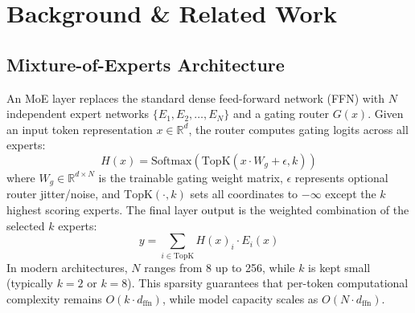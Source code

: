 \documentclass[10pt,journal,compsoc]{IEEEtran}
\begin{document}
\section{Background \& Related Work}
\label{sec:background}

\subsection{Mixture-of-Experts Architecture}
An MoE layer replaces the standard dense feed-forward network (FFN) with $N$ independent expert networks $\{E_1, E_2, \dots, E_N\}$ and a gating router $G(x)$. Given an input token representation $x \in \mathbb{R}^d$, the router computes gating logits across all experts:
\begin{equation}
    H(x) = \text{Softmax}(\text{TopK}(x \cdot W_g + \epsilon, k))
\end{equation}
where $W_g \in \mathbb{R}^{d \times N}$ is the trainable gating weight matrix, $\epsilon$ represents optional router jitter/noise, and $\text{TopK}(\cdot, k)$ sets all coordinates to $-\infty$ except the $k$ highest scoring experts. The final layer output is the weighted combination of the selected $k$ experts:
\begin{equation}
    y = \sum_{i \in \text{TopK}} H(x)_i \cdot E_i(x)
\end{equation}
In modern architectures, $N$ ranges from 8 up to 256, while $k$ is kept small (typically $k=2$ or $k=8$). This sparsity guarantees that per-token computational complexity remains $O(k \cdot d_{\text{ffn}})$, while model capacity scales as $O(N \cdot d_{\text{ffn}})$.
\end{document}
